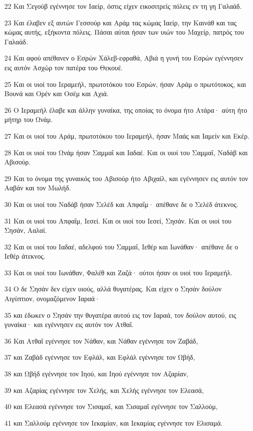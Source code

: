 \par 22 Και Σεγούβ εγέννησε τον Ιαείρ, όστις είχεν εικοσιτρείς πόλεις εν τη γη Γαλαάδ.
\par 23 Και έλαβεν εξ αυτών Γεσσούρ και Αράμ τας κώμας Ιαείρ, την Καινάθ και τας κώμας αυτής, εξήκοντα πόλεις. Πάσαι αύται ήσαν των υιών του Μαχείρ, πατρός του Γαλαάδ.
\par 24 Και αφού απέθανεν ο Εσρών Χάλεβ-εφραθά, Αβιά η γυνή του Εσρών εγέννησεν εις αυτόν Ασχώρ τον πατέρα του Θεκουέ.
\par 25 Και οι υιοί του Ιεραμεήλ, πρωτοτόκου του Εσρών, ήσαν Αράμ ο πρωτότοκος, και Βουνά και Ορέν και Οσέμ και Αχιά.
\par 26 Ο Ιεραμεήλ έλαβε και άλλην γυναίκα, της οποίας το όνομα ήτο Ατάρα· αύτη ήτο μήτηρ του Ωνάμ.
\par 27 Και οι υιοί του Αράμ, πρωτοτόκου του Ιεραμεήλ, ήσαν Μαάς και Ιαμείν και Εκέρ.
\par 28 Και οι υιοί του Ωνάμ ήσαν Σαμμαΐ και Ιαδαέ. Και οι υιοί του Σαμμαΐ, Ναδάβ και Αβισούρ.
\par 29 Και το όνομα της γυναικός του Αβισούρ ήτο Αβιχαίλ, και εγέννησεν εις αυτόν τον Ααβάν και τον Μωλήδ.
\par 30 Και οι υιοί του Ναδάβ ήσαν Σελέδ και Απφαΐμ· απέθανε δε ο Σελέδ άτεκνος.
\par 31 Και οι υιοί του Απφαΐμ, Ιεσεί. Και οι υιοί του Ιεσεί, Σησάν. Και οι υιοί του Σησάν, Ααλαί.
\par 32 Και οι υιοί του Ιαδαέ, αδελφού του Σαμμαΐ, Ιεθέρ και Ιωνάθαν· απέθανε δε ο Ιεθέρ άτεκνος.
\par 33 Και οι υιοί του Ιωνάθαν, Φαλέθ και Ζαζά· ούτοι ήσαν οι υιοί του Ιεραμεήλ.
\par 34 Ο δε Σησάν δεν είχεν υιούς, αλλά θυγατέρας. Και είχεν ο Σησάν δούλον Αιγύπτιον, ονομαζόμενον Ιαραά·
\par 35 και έδωκεν ο Σησάν την θυγατέρα αυτού εις τον Ιαραά, τον δούλον αυτού, εις γυναίκα· και εγέννησεν εις αυτόν τον Ατθαΐ.
\par 36 Και Ατθαΐ εγέννησε τον Νάθαν, και Νάθαν εγέννησε τον Ζαβάδ,
\par 37 και Ζαβάδ εγέννησε τον Εφλάλ, και Εφλάλ εγέννησε τον Ωβήδ,
\par 38 και Ωβήδ εγέννησε τον Ιηού, και Ιηού εγέννησε τον Αζαρίαν,
\par 39 και Αζαρίας εγέννησε τον Χελής, και Χελής εγέννησε τον Ελεασά,
\par 40 και Ελεασά εγέννησε τον Σισαμαΐ, και Σισαμαΐ εγέννησε τον Σαλλούμ,
\par 41 και Σαλλούμ εγέννησε τον Ιεκαμίαν, και Ιεκαμίας εγέννησε τον Ελισαμά.
